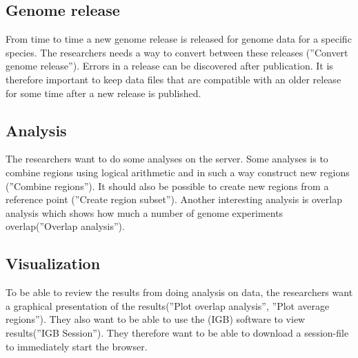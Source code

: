 \subsection{Genome release}
From time to time a new genome release is released for genome data for a specific species. The researchers needs a way to convert between these releases (''Convert genome release''). Errors in a release can be discovered after publication. It is therefore important to keep data files that are compatible with an older release for some time after a new release is published.  

\subsection{Analysis}
The researchers want to do some analyses on the server. Some analyses is to combine regions using logical arithmetic and in such a way construct new regions (''Combine regions''). It should also be possible to create new regions from a reference point (''Create region subset''). Another interesting analysis is overlap analysis which shows how much a number of genome experiments overlap(''Overlap analysis'').

\subsection{Visualization}
To be able to review the results from doing analysis on data,  the researchers want a graphical presentation of the results(''Plot overlap analysis'', ''Plot average regions''). They also want to be able to use the  (IGB) software to view results(''IGB Session''). They therefore want to be able to download a session-file to immediately start the browser. 